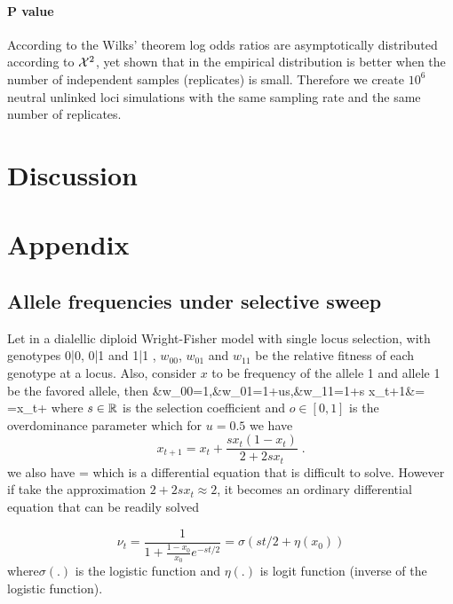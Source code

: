 \documentclass[11pt]{article}
\begin{document}
\paragraph{P value}
According to the Wilks’ theorem \cite{}  log odds ratios are asymptotically distributed according to ${\cal X}^2$, yet \cite{feder2014Identifying} shown that in the empirical distribution is better when the number of independent samples (replicates) is small. Therefore we create $10^6$ neutral unlinked loci simulations with the same sampling rate and the same number of replicates.







\section{Discussion}


\section{Appendix}
\subsection{Allele frequencies under selective sweep} \label{app:af}
Let in a dialellic diploid Wright-Fisher model with single locus selection, 
with genotypes 0|0, 0|1 and 1|1 , $w_{00}$, $w_{01}$ and  $w_{11}$ be the 
relative fitness of each genotype at a locus. Also, consider $x$ to be 
frequency of the allele 1 and allele 1 be the favored allele, then
\beq
&w_{00}=1,&w_{01}=1+us,&w_{11}=1+s
\eeq
\beq
x_{t+1}&= =x_t+ 
\eeq
where $s\in {\mathbb R}$ is the selection coefficient and $o\in[0,1]$ is the 
overdominance parameter which for $u=0.5$ we have
\begin{equation}
x_{t+1}=x_t+\frac{sx_t(1-x_t)}{2+2sx_t}\;.
\label{eq:transition}
\end{equation}
we also have
\beq
{} = 
\eeq
which is a differential equation that is difficult to solve. However if take 
the approximation $2+2sx_t \approx 2$, it becomes an ordinary differential 
equation that can be readily solved

\begin{equation}
\nu_t =\frac{1}{1+\frac{1-x_0}{x_0}e^{-st/2}} = \sigma(st/2+\eta(x_0)) 
\label{eq:inf-pop}
\end{equation}
where$\sigma(.)$ is the logistic
function and $\eta(.)$ is logit function (inverse of the logistic function). 
\end{document}
